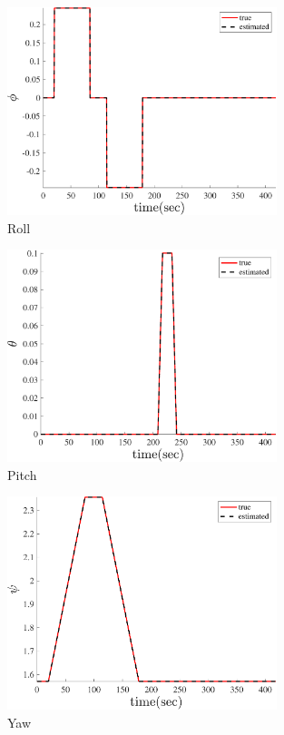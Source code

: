 \begin{figure}
    \centering
    \includegraphics[width=0.7\textwidth]{../Figure/Q5/phi}
    \caption{Roll}
\end{figure}
\begin{figure}
    \centering
    \includegraphics[width=0.7\textwidth]{../Figure/Q5/theta}
    \caption{Pitch}
\end{figure}
\begin{figure}
    \centering
    \includegraphics[width=0.7\textwidth]{../Figure/Q5/psi}
    \caption{Yaw}
\end{figure}